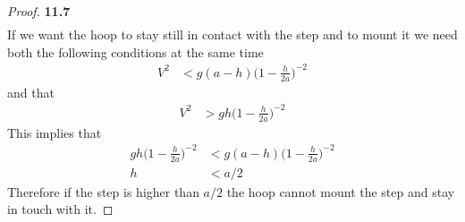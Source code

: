\documentclass[11pt]{article}
\theoremstyle{definition}
\begin{document}
\begin{proof}{\textbf{11.7}}
\begin{align*}
    \end{align*}
    If we want the hoop to stay still in contact with the step and to mount it
    we need both the following conditions at the same time
    \begin{align*}
        V^2 &< g(a-h) \bigg(1 - \frac{h}{2a}\bigg)^{-2}
    \end{align*}
    and that
    \begin{align*}
        V^2 &> gh\bigg(1 - \frac{h}{2a}\bigg)^{-2}
    \end{align*}
    This implies that
    \begin{align*}
        gh\bigg(1 - \frac{h}{2a}\bigg)^{-2}
        &< g(a-h) \bigg(1 - \frac{h}{2a}\bigg)^{-2}\\
        h &< a/2 
    \end{align*}
    Therefore if the step is higher than $a/2$ the hoop cannot mount the step
    and stay in touch with it.
\end{proof}
\cleardoublepage
\end{document}
